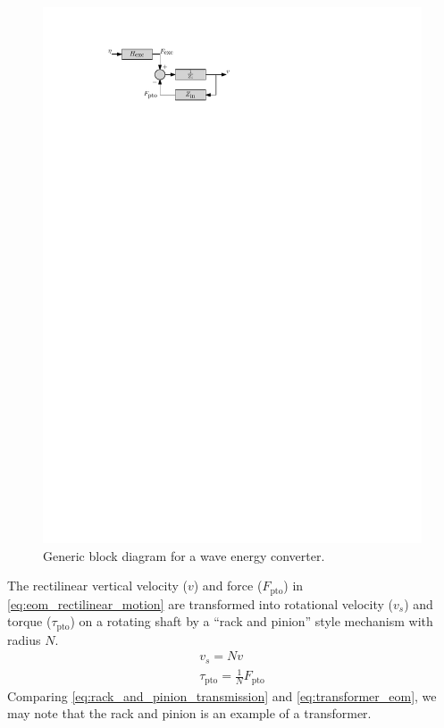 \documentclass[twocolumn]{autart}
\begin{document}
\begin{figure}[tb]
        \centering
        \includegraphics[width=0.8\columnwidth]{wec_as_multiport_block_diagram.pdf}
        \caption{Generic block diagram for a wave energy converter.}
        \label{fig:wec_as_multiport_block_diagram}
\end{figure}

The rectilinear vertical velocity ($v$) and force ($F_{\textrm{pto}}$) in \eqref{eq:eom_rectilinear_motion} are transformed into rotational velocity ($v_s$) and torque ($\tau_{\textrm{pto}}$) on a rotating shaft by a ``rack and pinion'' style mechanism with radius $N$.
%
\begin{subequations}
        \begin{gather}
                v_s = N v \\
                \tau_{\textrm{pto}} = \frac{1}{N} F_{\textrm{pto}}
        \end{gather}
        \label{eq:rack_and_pinion_transmission}%
\end{subequations}
%
Comparing \eqref{eq:rack_and_pinion_transmission} and \eqref{eq:transformer_eom}, we may note that the rack and pinion is an example of a transformer.
\end{document}

